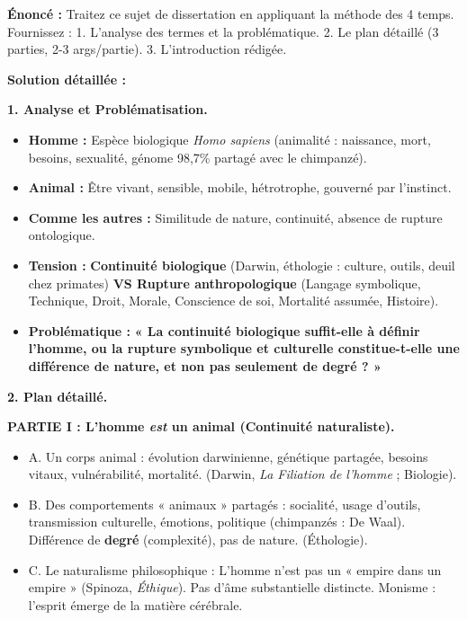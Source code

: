 \documentclass[11pt]{article}
\begin{document}
\begin{exoresolu}
\textbf{Énoncé :} Traitez ce sujet de dissertation en appliquant la méthode des 4 temps. Fournissez : 1. L'analyse des termes et la problématique. 2. Le plan détaillé (3 parties, 2-3 args/partie). 3. L'introduction rédigée.

\tcblower
\textbf{Solution détaillée :}

\textbf{1. Analyse et Problématisation.}
\begin{itemize}
    \item \textbf{Homme :} Espèce biologique \emph{Homo sapiens} (animalité : naissance, mort, besoins, sexualité, génome 98,7\% partagé avec le chimpanzé).
    \item \textbf{Animal :} Être vivant, sensible, mobile, hétrotrophe, gouverné par l'instinct.
    \item \textbf{Comme les autres :} Similitude de nature, continuité, absence de rupture ontologique.
    \item \textbf{Tension :} \textbf{Continuité biologique} (Darwin, éthologie : culture, outils, deuil chez primates) \textbf{VS Rupture anthropologique} (Langage symbolique, Technique, Droit, Morale, Conscience de soi, Mortalité assumée, Histoire).
    \item \textbf{Problématique :} \textbf{« La continuité biologique suffit-elle à définir l'homme, ou la rupture symbolique et culturelle constitue-t-elle une différence de nature, et non pas seulement de degré ? »}
\end{itemize}

\textbf{2. Plan détaillé.}

\textbf{PARTIE I : L'homme \emph{est} un animal (Continuité naturaliste).}
\begin{itemize}
    \item A. Un corps animal : évolution darwinienne, génétique partagée, besoins vitaux, vulnérabilité, mortalité. (Darwin, \emph{La Filiation de l'homme} ; Biologie).
    \item B. Des comportements « animaux » partagés : socialité, usage d'outils, transmission culturelle, émotions, politique (chimpanzés : De Waal). Différence de \textbf{degré} (complexité), pas de nature. (Éthologie).
    \item C. Le naturalisme philosophique : L'homme n'est pas un « empire dans un empire » (Spinoza, \emph{Éthique}). Pas d'âme substantielle distincte. Monisme : l'esprit émerge de la matière cérébrale.
\end{itemize}


\end{exoresolu}
\end{document}
